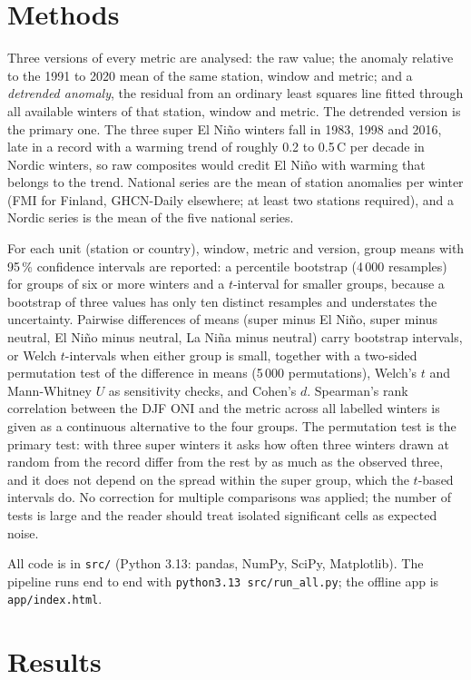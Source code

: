 \documentclass[11pt,a4paper]{article}
\newcommand{\degC}{\textdegree{}C}
\begin{document}
\section{Methods}

Three versions of every metric are analysed: the raw value; the anomaly relative to the 1991 to 2020 mean of the same station, window and metric; and a \emph{detrended anomaly}, the residual from an ordinary least squares line fitted through all available winters of that station, window and metric. The detrended version is the primary one. The three super El Niño winters fall in 1983, 1998 and 2016, late in a record with a warming trend of roughly 0.2 to 0.5\,\degC{} per decade in Nordic winters, so raw composites would credit El Niño with warming that belongs to the trend. National series are the mean of station anomalies per winter (FMI for Finland, GHCN-Daily elsewhere; at least two stations required), and a Nordic series is the mean of the five national series.

For each unit (station or country), window, metric and version, group means with 95\,\% confidence intervals are reported: a percentile bootstrap (4\,000 resamples) for groups of six or more winters and a $t$-interval for smaller groups, because a bootstrap of three values has only ten distinct resamples and understates the uncertainty. Pairwise differences of means (super minus El Niño, super minus neutral, El Niño minus neutral, La Niña minus neutral) carry bootstrap intervals, or Welch $t$-intervals when either group is small, together with a two-sided permutation test of the difference in means (5\,000 permutations), Welch's $t$ and Mann-Whitney $U$ as sensitivity checks, and Cohen's $d$. Spearman's rank correlation between the DJF ONI and the metric across all labelled winters is given as a continuous alternative to the four groups. The permutation test is the primary test: with three super winters it asks how often three winters drawn at random from the record differ from the rest by as much as the observed three, and it does not depend on the spread within the super group, which the $t$-based intervals do. No correction for multiple comparisons was applied; the number of tests is large and the reader should treat isolated significant cells as expected noise.

All code is in \texttt{src/} (Python 3.13: pandas, NumPy, SciPy, Matplotlib). The pipeline runs end to end with \texttt{python3.13 src/run\_all.py}; the offline app is \texttt{app/index.html}.

\section{Results}

\end{document}
